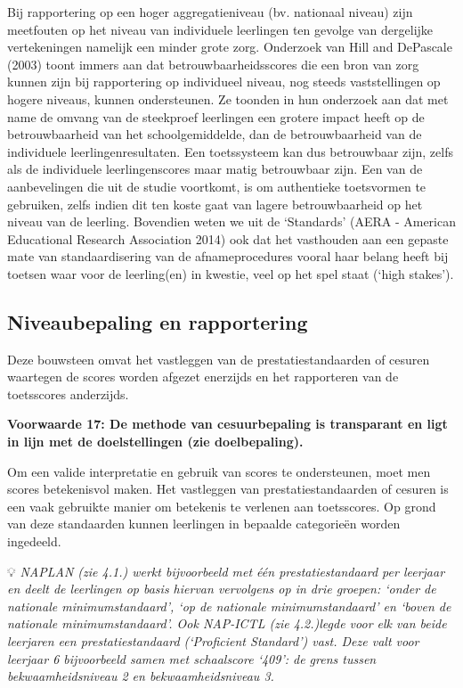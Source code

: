 \documentclass[
  letterpaper,
]{report}
\begin{document}
Bij rapportering op een hoger aggregatieniveau (bv. nationaal niveau)
zijn meetfouten op het niveau van individuele leerlingen ten gevolge van
dergelijke vertekeningen namelijk een minder grote zorg. Onderzoek van
Hill and DePascale (2003) toont immers aan dat betrouwbaarheidsscores
die een bron van zorg kunnen zijn bij rapportering op individueel
niveau, nog steeds vaststellingen op hogere niveaus, kunnen
ondersteunen. Ze toonden in hun onderzoek aan dat met name de omvang van
de steekproef leerlingen een grotere impact heeft op de betrouwbaarheid
van het schoolgemiddelde, dan de betrouwbaarheid van de individuele
leerlingenresultaten. Een toetssysteem kan dus betrouwbaar zijn, zelfs
als de individuele leerlingenscores maar matig betrouwbaar zijn. Een van
de aanbevelingen die uit de studie voortkomt, is om authentieke
toetsvormen te gebruiken, zelfs indien dit ten koste gaat van lagere
betrouwbaarheid op het niveau van de leerling. Bovendien weten we uit de
`Standards' (AERA - American Educational Research Association 2014) ook
dat het vasthouden aan een gepaste mate van standaardisering van de
afnameprocedures vooral haar belang heeft bij toetsen waar voor de
leerling(en) in kwestie, veel op het spel staat (`high stakes').

\hypertarget{niveaubepaling-en-rapportering}{%
\subsection{Niveaubepaling en
rapportering}\label{niveaubepaling-en-rapportering}}

Deze bouwsteen omvat het vastleggen van de prestatiestandaarden of
cesuren waartegen de scores worden afgezet enerzijds en het rapporteren
van de toetsscores anderzijds.

\textbf{Voorwaarde 17: De methode van cesuurbepaling is transparant en
ligt in lijn met de doelstellingen (zie doelbepaling).}

Om een valide interpretatie en gebruik van scores te ondersteunen, moet
men scores betekenisvol maken. Het vastleggen van prestatiestandaarden
of cesuren is een vaak gebruikte manier om betekenis te verlenen aan
toetsscores. Op grond van deze standaarden kunnen leerlingen in bepaalde
categorieën worden ingedeeld.

💡 \emph{NAPLAN (zie 4.1.) werkt bijvoorbeeld met één prestatiestandaard
per leerjaar en deelt de leerlingen op basis hiervan vervolgens op in
drie groepen: `onder de nationale minimumstandaard', `op de nationale
minimumstandaard' en `boven de nationale minimumstandaard'. Ook NAP-ICTL
(zie 4.2.)legde voor elk van beide leerjaren een prestatiestandaard
(`Proficient Standard') vast. Deze valt voor leerjaar 6 bijvoorbeeld
samen met schaalscore `409': de grens tussen bekwaamheidsniveau 2 en
bekwaamheidsniveau 3.}
\end{document}
